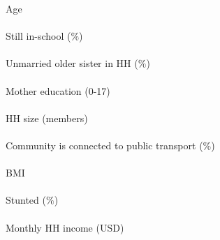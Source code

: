 Age \\
\\
Still in-school ($\%$) \\
\\
Unmarried older sister in HH ($\%$) \\
\\
Mother education (0-17) \\
\\
HH size (members) \\
\\
Community is connected to public transport ($\%$) \\
\\
BMI \\
\\
Stunted ($\%$) \\
\\
Monthly HH income (USD) \\
\\